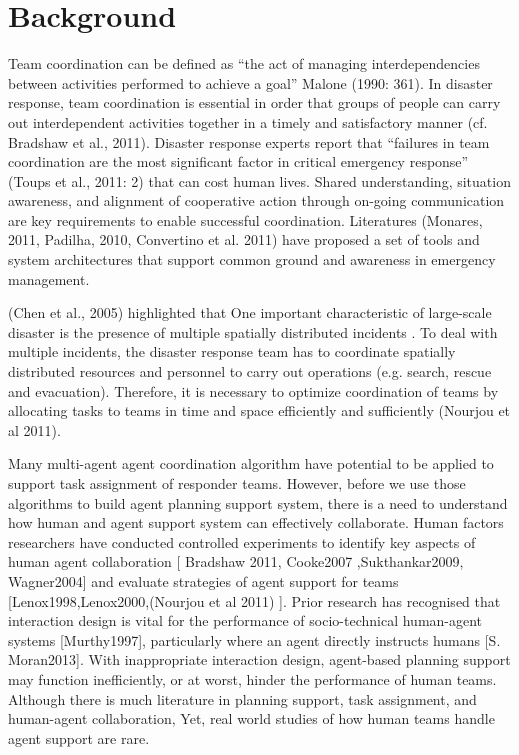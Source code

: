\section{Background}

Team coordination can be defined as “the act of managing interdependencies between activities performed to achieve a goal” Malone (1990: 361). In disaster response, team coordination is essential in order that groups of people can carry out interdependent activities together in a timely and satisfactory manner (cf. Bradshaw et al., 2011). Disaster response experts report that “failures in team coordination are the most significant factor in critical emergency response” (Toups et al., 2011: 2) that can cost human lives. Shared understanding, situation awareness, and alignment of cooperative action through on-going communication are key requirements to enable successful coordination. Literatures (Monares, 2011, Padilha, 2010, Convertino et al. 2011) have proposed a set of tools and system architectures that support common ground and awareness in emergency management. 

(Chen et al., 2005) highlighted that One important characteristic of large-scale disaster is the presence of multiple spatially distributed incidents . To deal with multiple incidents, the disaster response team has to coordinate spatially distributed resources and personnel to carry out operations (e.g. search, rescue and evacuation). Therefore, it is necessary to optimize coordination of teams by allocating tasks to teams in time and space efficiently and sufficiently (Nourjou et al 2011). 

Many multi-agent agent coordination algorithm have potential to be applied to support task assignment of responder teams. However, before we use those algorithms to build agent planning support system, there is a need to understand how human and agent support system can effectively collaborate.  Human factors researchers have conducted controlled experiments to identify key aspects of human agent collaboration [ Bradshaw 2011, Cooke2007 ,Sukthankar2009, Wagner2004] and evaluate strategies of agent support for teams [Lenox1998,Lenox2000,(Nourjou et al 2011) ]. Prior research has recognised that interaction design is vital for the performance of socio-technical human-agent systems [Murthy1997], particularly where an agent directly instructs humans [S. Moran2013]. With inappropriate interaction design, agent-based planning support may function inefficiently, or at worst, hinder the performance of human teams. Although there is much literature in planning support, task assignment, and human-agent collaboration, Yet, real world studies of how human teams handle agent support are rare. 

